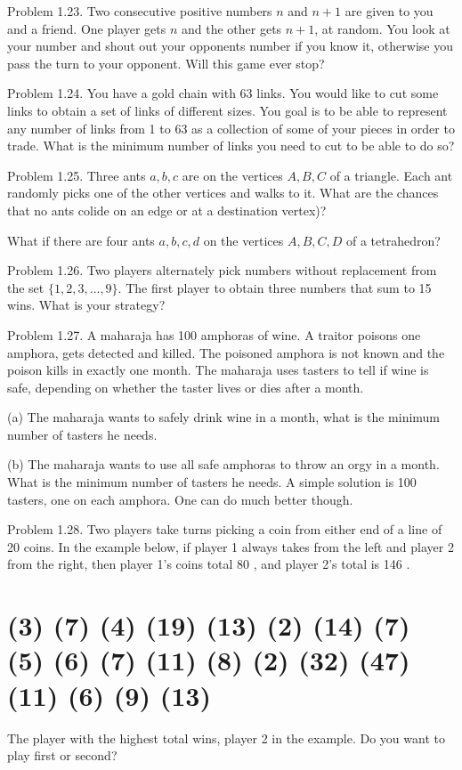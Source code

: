 \documentclass[10pt]{article}
\begin{document}
Problem 1.23. Two consecutive positive numbers $n$ and $n+1$ are given to you and a friend. One player gets $n$ and the other gets $n+1$, at random. You look at your number and shout out your opponents number if you know it, otherwise you pass the turn to your opponent. Will this game ever stop?

Problem 1.24. You have a gold chain with 63 links. You would like to cut some links to obtain a set of links of different sizes. You goal is to be able to represent any number of links from 1 to 63 as a collection of some of your pieces in order to trade. What is the minimum number of links you need to cut to be able to do so?

Problem 1.25. Three ants $a, b, c$ are on the vertices $A, B, C$ of a triangle. Each ant randomly picks one of the other vertices and walks to it. What are the chances that no ants colide on an edge or at a destination vertex)?

What if there are four ants $a, b, c, d$ on the vertices $A, B, C, D$ of a tetrahedron?

Problem 1.26. Two players alternately pick numbers without replacement from the set $\{1,2,3, \ldots, 9\}$. The first player to obtain three numbers that sum to 15 wins. What is your strategy?

Problem 1.27. A maharaja has 100 amphoras of wine. A traitor poisons one amphora, gets detected and killed. The poisoned amphora is not known and the poison kills in exactly one month. The maharaja uses tasters to tell if wine is safe, depending on whether the taster lives or dies after a month.

(a) The maharaja wants to safely drink wine in a month, what is the minimum number of tasters he needs.

(b) The maharaja wants to use all safe amphoras to throw an orgy in a month. What is the minimum number of tasters he needs. A simple solution is 100 tasters, one on each amphora. One can do much better though.

Problem 1.28. Two players take turns picking a coin from either end of a line of 20 coins. In the example below, if player 1 always takes from the left and player 2 from the right, then player 1's coins total 80 , and player 2's total is 146 .

\section*{(3) (7) (4) (19) (13) (2) (14) (7) (5) (6) (7) (11) (8) (2) (32) (47) (11) (6) (9) (13)}
The player with the highest total wins, player 2 in the example. Do you want to play first or second?
\end{document}
